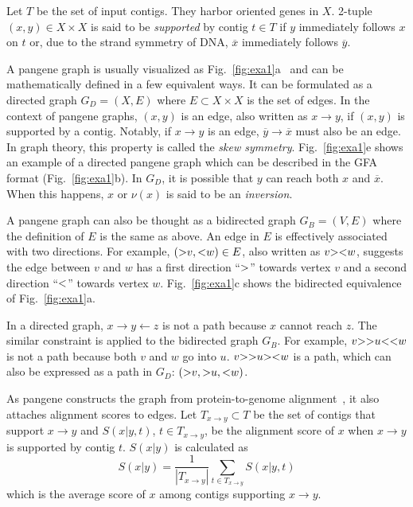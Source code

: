 \documentclass[webpdf,contemporary,large,namedate]{oup-authoring-template}%
\begin{document}
Let $T$ be the set of input contigs.
They harbor oriented genes in $X$.
2-tuple $(x,y)\in X\times X$ is said to be \emph{supported} by contig $t\in T$
if $y$ immediately follows $x$ on $t$ or, due to the strand symmetry of DNA, $\overline{x}$ immediately follows $\overline{y}$.

A pangene graph is usually visualized as Fig.~\ref{fig:exa1}a~\citep{Wick:2015qf}
and can be mathematically defined in a few equivalent ways.
It can be formulated as a directed graph $G_D=(X,E)$ where $E\subset X\times X$ is the set of edges.
In the context of pangene graphs, $(x,y)$ is an edge, also written as $x\to y$, if $(x,y)$ is supported by a contig.
Notably, if $x\to y$ is an edge, $\overline{y}\to\overline{x}$ must also be an edge.
In graph theory, this property is called the \emph{skew symmetry}.
Fig.~\ref{fig:exa1}e shows an example of a directed pangene graph
which can be described in the GFA format (Fig.~\ref{fig:exa1}b).
In $G_D$, it is possible that $y$ can reach both $x$ and $\overline{x}$.
When this happens, $x$ or $\nu(x)$ is said to be an \emph{inversion}.

A pangene graph can also be thought as a bidirected graph $G_B=(V,E)$ where the definition of $E$ is the same as above.
An edge in $E$ is effectively associated with two directions.
For example, $({\rm >}v,{\rm <}w)\in E$, also written as $v{\rm ><}w$,
suggests the edge between $v$ and $w$ has a first direction ``${\rm >}$'' towards vertex $v$ and a second direction ``${\rm <}$'' towards vertex $w$.
Fig.~\ref{fig:exa1}c shows the bidirected equivalence of Fig.~\ref{fig:exa1}a.

In a directed graph, $x\to y\gets z$ is not a path because $x$ cannot reach $z$.
The similar constraint is applied to the bidirected graph $G_B$.
For example, $v{\rm >>}u{\rm <<}w$ is not a path because both $v$ and $w$ go into $u$.
$v{\rm >>}u{\rm ><}w$ is a path, which can also be expressed as a path in $G_D$: $({\rm >}v,{\rm >}u,{\rm <}w)$.


As pangene constructs the graph from protein-to-genome alignment~\citep{Li:2023ac},
it also attaches alignment scores to edges.
Let $T_{x\to y}\subset T$ be the set of contigs that support $x\to y$
and $S(x|y,t)$, $t\in T_{x\to y}$, be the alignment score of $x$ when $x\to y$ is supported by contig $t$.
$S(x|y)$ is calculated as
$$
S(x|y)=\frac{1}{|T_{x\to y}|}\sum_{t\in T_{x\to y}}S(x|y,t)
$$
which is the average score of $x$ among contigs supporting $x\to y$.
\end{document}
